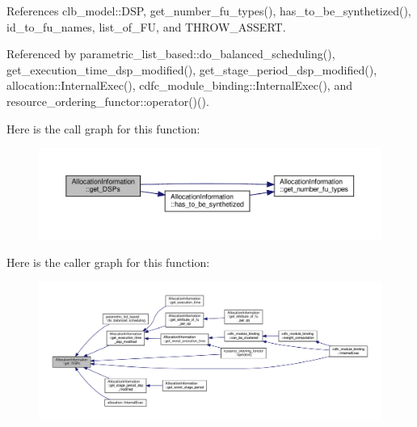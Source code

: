 References clb\+\_\+model\+::\+D\+SP, get\+\_\+number\+\_\+fu\+\_\+types(), has\+\_\+to\+\_\+be\+\_\+synthetized(), id\+\_\+to\+\_\+fu\+\_\+names, list\+\_\+of\+\_\+\+FU, and T\+H\+R\+O\+W\+\_\+\+A\+S\+S\+E\+RT.



Referenced by parametric\+\_\+list\+\_\+based\+::do\+\_\+balanced\+\_\+scheduling(), get\+\_\+execution\+\_\+time\+\_\+dsp\+\_\+modified(), get\+\_\+stage\+\_\+period\+\_\+dsp\+\_\+modified(), allocation\+::\+Internal\+Exec(), cdfc\+\_\+module\+\_\+binding\+::\+Internal\+Exec(), and resource\+\_\+ordering\+\_\+functor\+::operator()().

Here is the call graph for this function\+:
\nopagebreak
\begin{figure}[H]
\begin{center}
\leavevmode
\includegraphics[width=350pt]{d7/d79/classAllocationInformation_a82d30f63d76245714b5a3b6a805d8aaf_cgraph}
\end{center}
\end{figure}
Here is the caller graph for this function\+:
\nopagebreak
\begin{figure}[H]
\begin{center}
\leavevmode
\includegraphics[width=350pt]{d7/d79/classAllocationInformation_a82d30f63d76245714b5a3b6a805d8aaf_icgraph}
\end{center}
\end{figure}
\mbox{\label{classAllocationInformation_a179bb372b147744dc250c8d310f3e1e8}} 
